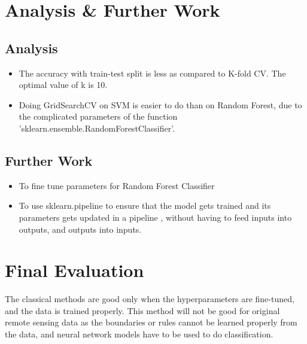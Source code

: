 \documentclass[a4paper, 11pt]{article}
\begin{document}
\section{Analysis \& Further Work}

\subsection{Analysis}
\begin{itemize}
\item The accuracy with train-test split is less as compared to K-fold CV.
The optimal value of k is 10.

\item Doing GridSearchCV on SVM is easier to do than on Random Forest, due to the complicated parameters of the function 'sklearn.ensemble.RandomForestClassifier'.
\end{itemize}
\subsection{Further Work}
\begin{itemize}
\item To fine tune parameters for Random Forest Classifier
\item To use sklearn.pipeline to ensure that the model gets trained and its parameters gets updated in a pipeline , without having to feed inputs into outputs, and outputs into inputs.
\end{itemize}

\section*{Final Evaluation}
The classical methods are good only when the hyperparameters are fine-tuned, and the data is trained properly. 
\newline
This method will not be good for original remote sensing data as the boundaries or rules cannot be learned properly from the data, and neural network models have to be used to do classification.
\end{document}

